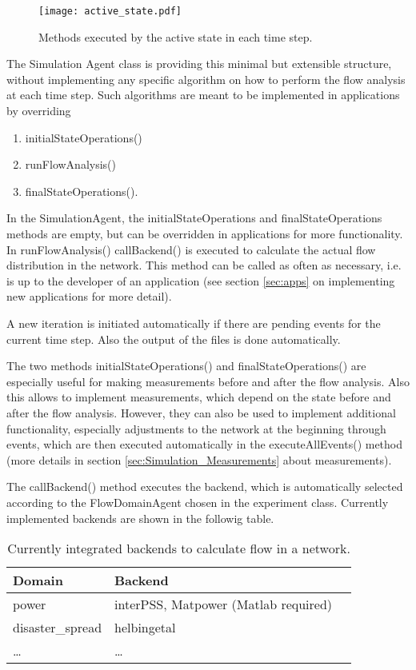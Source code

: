 \documentclass[11pt,fleqn]{book} %
\newcommand{\MainAgent}{Simulation Agent }
\newcommand{\Backend}[1][]{Backend#1} %
\newcommand{\backend}[1][]{backend#1}
\newcommand{\Domain}[1][]{Domain#1} %
\begin{document}
\begin{figure}[!h]
\centering\texttt{[image: active\_state.pdf]}
\caption{Methods executed by the active state in each time step.}
\label{fig:active_state}
\end{figure}

The \MainAgent{} class is providing this minimal but extensible structure, without implementing any specific algorithm on how to perform the flow analysis at each time step. Such algorithms are meant to be implemented in applications by overriding 
\begin{enumerate}
	\item initialStateOperations()
	\item runFlowAnalysis()
	\item finalStateOperations().
\end{enumerate}

In the SimulationAgent, the initialStateOperations and finalStateOperations methods are empty, but can be overridden in applications for more functionality. In runFlowAnalysis() callBackend() is executed to calculate the actual flow distribution in the network. This method can be called as often as necessary, i.e. is up to the developer of an application (see section \ref{sec:apps} on implementing new applications for more detail). 

A new iteration is initiated automatically if there are pending events for the current time step. Also the output of the files is done automatically. 

The two methods initialStateOperations() and finalStateOperations() are especially useful for making measurements before and after the flow analysis. Also this allows to implement measurements, which depend on the state before and after the flow analysis. However, they can also be used to implement additional functionality, especially adjustments to the network at the beginning through events, which are then executed automatically in the executeAllEvents() method (more details in section \ref{sec:Simulation_Measurements} about measurements).

The callBackend() method executes the \backend{}, which is automatically selected according to the FlowDomainAgent chosen in the experiment class. Currently implemented \backend{s} are shown in the followig table.
\begin{table}[h]
	\centering
	\begin{tabular}{|l| l |l|}
	\hline
	\rowcolor{Gray}
	\textbf{\Domain{}}&\textbf{\Backend{}}\\
	\hline
	power & interPSS, Matpower (Matlab required)\\
	\hline
	disaster\_spread & helbingetal\\
	\hline
	\dots & \dots\\
	\hline
	\end{tabular}
	\label{table:backends}
	\caption{Currently integrated \backend{s} to calculate flow in a network.}
\end{table}
\end{document}

